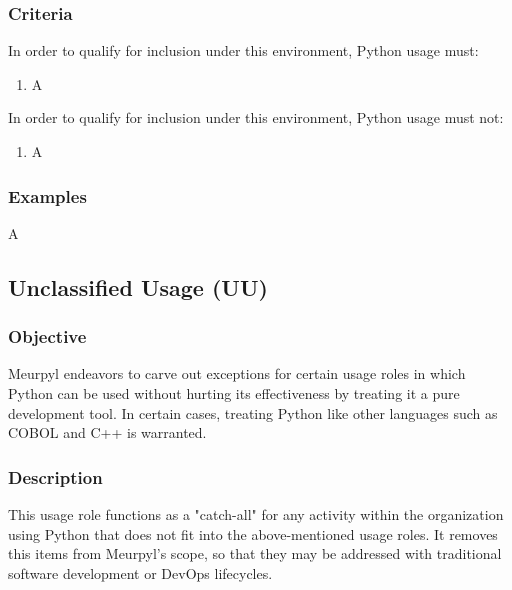 		\subsubsection{Criteria}

			In order to qualify for inclusion under this environment, Python usage must:

			\begin{enumerate}
        		\item A
        	\end{enumerate}

			In order to qualify for inclusion under this environment, Python usage must not:

			\begin{enumerate}
        		\item A
        	\end{enumerate}

		\subsubsection{Examples}

			A


	\subsection{Unclassified Usage (UU)}

		\subsubsection{Objective}

			Meurpyl endeavors to carve out exceptions for certain usage roles in which Python can be used without hurting its effectiveness by treating it a pure development tool. In certain cases, treating Python like other languages such as COBOL and C++ is warranted.

		\subsubsection{Description}

			This usage role functions as a "catch-all" for any activity within the organization using Python that does not fit into the above-mentioned usage roles. It removes this items from Meurpyl's scope, so that they may be addressed with traditional software development or DevOps lifecycles.

